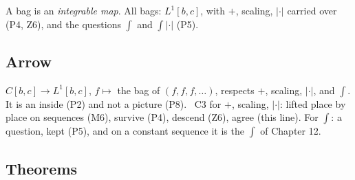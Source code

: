 \begin{lines}
\item[\lab{N1}] A bag is an \emph{integrable map}. All bags: $L^1[b,c]$, with $+$, scaling, $|\cdot|$ carried over (P4, Z6), and the questions $\int$ and $\int |\cdot|$ (P5).
\end{lines}

\subsection*{Arrow}

\begin{lines}
\item[\lab{P9}] $C[b,c] \to L^1[b,c]$, $f \mapsto$ the bag of $(f, f, f, \dots)$, respects $+$, scaling, $|\cdot|$, and $\int$. It is an inside (P2) and not a picture (P8). \ C3 for $+$, scaling, $|\cdot|$: lifted place by place on sequences (M6), survive (P4), descend (Z6), agree (this line). For $\int$: a question, kept (P5), and on a constant sequence it is the $\int$ of Chapter 12.
\end{lines}

\subsection*{Theorems}

